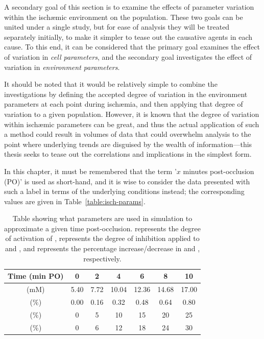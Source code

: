 \documentclass[../thesis-main.tex]{subfiles}
\begin{document}
A secondary goal of this section is to examine the effects of parameter variation within the isch\ae{}mic environment on the population. These two goals can be united under a single study, but for ease of analysis they will be treated separately initially, to make it simpler to tease out the causative agents in each cause. To this end, it can be considered that the primary goal examines the effect of variation in \emph{cell parameters}, and the secondary goal investigates the effect of variation in \emph{environment parameters}.

It should be noted that it would be relatively simple to combine the investigations by defining the accepted degree of variation in the environment parameters at each point during isch\ae{}mia, and then applying that degree of variation to a given population. However, it is known that the degree of variation within isch\ae{}mic parameters can be great, and thus the actual application of such a method could result in volumes of data that could overwhelm analysis to the point where underlying trends are disguised by the wealth of information---this thesis seeks to tease out the correlations and implications in the simplest form.

In this chapter, it must be remembered that the term '$x$ minutes post-occlusion (PO)' is used as short-hand, and it is wise to consider the data presented with such a label in terms of the underlying conditions instead; the corresponding values are given in Table~\ref{table:isch-params}.
\begin{table}
 \centering
 \begin{tabular}{c|cccccc}
  Time (min PO) & 0 & 2 & 4 & 6 & 8 & 10 \\
  \hline
  \hline
  \ko{} (mM) & 5.40 & 7.72 & 10.04 & 12.36 & 14.68 & 17.00 \\
  \fkatp{} ($\%$) & 0.00 & 0.16 & 0.32 & 0.48 & 0.64 & 0.80 \\
  \finhib{} ($\%$) & 0 & 5 & 10 & 15 & 20 & 25 \\
  \fna{} ($\%$) & 0 & 6 & 12 & 18 & 24 & 30
 \end{tabular}
 \caption[Isch\ae{}mic environment parameters]{Table showing what parameters are used in simulation to approximate a given time post-occlusion. \fkatp{} represents the degree of activation of \ikatp{}, \finhib{} represents the degree of inhibition applied to \ina{} and \ica{}, and \fna{} represents the percentage increase/decrease in \nai{} and \inak{}, respectively.}
 \label{table:optimum-order}
\end{table}
\end{document}
